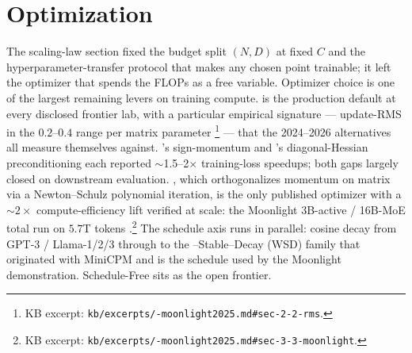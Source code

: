 
\section{Optimization}
\label{sec:optimization}

The scaling-law section fixed the budget split $(N, D)$ at fixed $C$
and the hyperparameter-transfer protocol that makes any chosen point
trainable; it left the optimizer that spends the FLOPs as a free
variable. Optimizer choice is one of the largest remaining levers on
training compute.  is the production default at every disclosed
frontier lab, with a particular empirical signature
--- update-RMS in the $0.2$--$0.4$ range per matrix parameter
\citep[\S 2.2]{muon-moonlight2025}\footnote{KB excerpt:
\texttt{kb/excerpts/-moonlight2025.md\#sec-2-2-rms}.} --- that the
2024--2026 alternatives all measure themselves against. 's
sign-momentum and 's diagonal-Hessian preconditioning each
reported $\sim$1.5--2$\times$ training-loss speedups; both gaps largely
closed on downstream evaluation.   \citep{muon-moonlight2025},
which orthogonalizes momentum on matrix  via a Newton--Schulz
polynomial iteration, is the only published optimizer with a
$\sim\!2\times$ compute-efficiency lift verified at  scale: the
Moonlight 3B-active / 16B-MoE total run on $5.7$T tokens
\citep[\S 3.3]{muon-moonlight2025}.\footnote{KB excerpt:
\texttt{kb/excerpts/-moonlight2025.md\#sec-3-3-moonlight}.} The
schedule axis runs in parallel: cosine decay from GPT-3 / Llama-1/2/3
through to the --Stable--Decay (WSD) family that originated with
MiniCPM \citep{phi4} and is the schedule used by the Moonlight 
demonstration. Schedule-Free \citep[ICML
2024]{muon-moonlight2025} sits as the open frontier.

